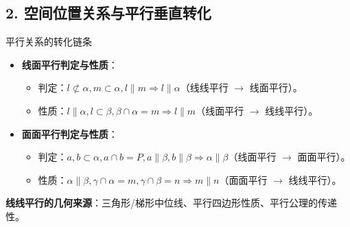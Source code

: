 \documentclass[11pt,a4paper]{ctexart}
\begin{document}

\subsection{2. 空间位置关系与平行垂直转化}

\begin{teachbox}{平行关系的转化链条}
\begin{itemize}
  \item \textbf{线面平行判定与性质}：
    \begin{itemize}
      \item 判定：$l \not\subset \alpha, m \subset \alpha, l \parallel m \Rightarrow l \parallel \alpha$（线线平行 $\rightarrow$ 线面平行）。
      \item 性质：$l \parallel \alpha, l \subset \beta, \beta \cap \alpha = m \Rightarrow l \parallel m$（线面平行 $\rightarrow$ 线线平行）。
    \end{itemize}
  \item \textbf{面面平行判定与性质}：
    \begin{itemize}
      \item 判定：$a, b \subset \alpha, a \cap b = P, a \parallel \beta, b \parallel \beta \Rightarrow \alpha \parallel \beta$（线面平行 $\rightarrow$ 面面平行）。
      \item 性质：$\alpha \parallel \beta, \gamma \cap \alpha = m, \gamma \cap \beta = n \Rightarrow m \parallel n$（面面平行 $\rightarrow$ 线线平行）。
    \end{itemize}
\end{itemize}
\textbf{线线平行的几何来源}：三角形/梯形中位线、平行四边形性质、平行公理的传递性。
\end{teachbox}
\end{document}
